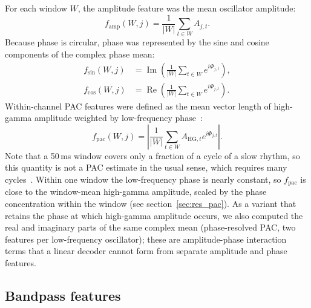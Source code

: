 \documentclass{iopjournal}
\begin{document}
For each window $W$, the amplitude feature was the mean oscillator amplitude:
\begin{equation}
    f_{\mathrm{amp}}(W,j)=\frac{1}{|W|}\sum_{t\in W} A_{j,t}.
\end{equation}
Because phase is circular, phase was represented by the sine and cosine components of the complex phase mean:
\begin{align}
    f_{\sin}(W,j) &= \operatorname{Im}\left(\frac{1}{|W|}\sum_{t\in W} e^{i\Phi_{j,t}}\right), \\
    f_{\cos}(W,j) &= \operatorname{Re}\left(\frac{1}{|W|}\sum_{t\in W} e^{i\Phi_{j,t}}\right).
\end{align}
Within-channel PAC features were defined as the mean vector length of high-gamma amplitude weighted by low-frequency phase~\cite{Canolty2006}:
\begin{equation}
    f_{\mathrm{pac}}(W,j)=\left|\frac{1}{|W|}\sum_{t\in W} A_{\mathrm{HG},t} e^{i\Phi_{j,t}}\right|.
\end{equation}
Note that a 50\,ms window covers only a fraction of a cycle of a slow rhythm, so this quantity is not a PAC estimate in the usual sense, which requires many cycles~\cite{Tort2010,Aru2015}. Within one window the low-frequency phase is nearly constant, so $f_{\mathrm{pac}}$ is close to the window-mean high-gamma amplitude, scaled by the phase concentration within the window (see section~\ref{sec:res_pac}). As a variant that retains the phase at which high-gamma amplitude occurs, we also computed the real and imaginary parts of the same complex mean (phase-resolved PAC, two features per low-frequency oscillator); these are amplitude-phase interaction terms that a linear decoder cannot form from separate amplitude and phase features.

\subsection{Bandpass features}
\label{sec:bandpass}
\end{document}
